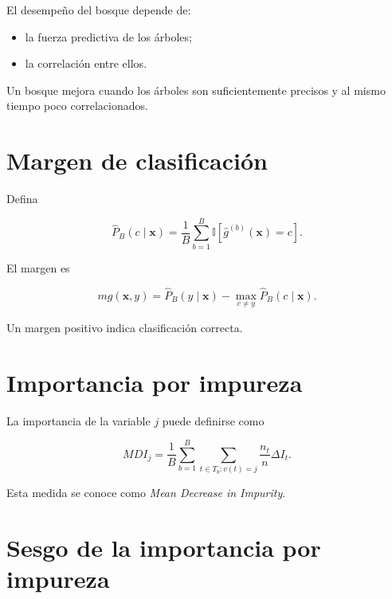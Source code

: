 \documentclass[
  spanish,
  10.5pt,
  letterpaper,
  DIV=11,
  numbers=noendperiod,
  oneside,
  open=any]{scrreprt}
\providecommand{\tightlist}{%
  \setlength{\itemsep}{0pt}\setlength{\parskip}{0pt}}
\theoremstyle{definition}
\theoremstyle{definition}
\theoremstyle{plain}
\theoremstyle{remark}
\begin{document}

El desempeño del bosque depende de:

\begin{itemize}
\tightlist
\item
  la fuerza predictiva de los árboles;
\item
  la correlación entre ellos.
\end{itemize}

Un bosque mejora cuando los árboles son suficientemente precisos y al
mismo tiempo poco correlacionados.

\section*{Margen de clasificación}\label{margen-de-clasificaciuxf3n}


Defina

\[
\widehat{P}_B(c\mid\mathbf{x})
=
\frac{1}{B}
\sum_{b=1}^{B}
\mathbb{I}
\left[
\widehat{g}^{(b)}(\mathbf{x})=c
\right].
\]

El margen es

\[
mg(\mathbf{x},y)
=
\widehat{P}_B(y\mid\mathbf{x})
-
\max_{c\neq y}\widehat{P}_B(c\mid\mathbf{x}).
\]

Un margen positivo indica clasificación correcta.

\section*{Importancia por impureza}\label{importancia-por-impureza}


La importancia de la variable \(j\) puede definirse como

\[
MDI_j
=
\frac{1}{B}
\sum_{b=1}^{B}
\sum_{t\in T_b:v(t)=j}
\frac{n_t}{n}\Delta I_t.
\]

Esta medida se conoce como \emph{Mean Decrease in Impurity}.

\section*{Sesgo de la importancia por
impureza}\label{sesgo-de-la-importancia-por-impureza}
\end{document}
